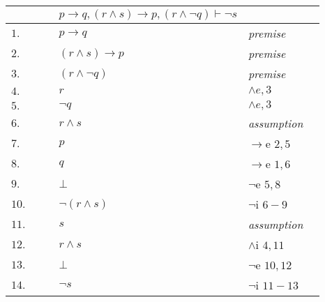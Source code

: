 \documentclass[12pt]{article}
\begin{document}
\begin{table}[H]
	\centering

	\begin{tabular}{*6{l}}
        $ $ & & & $ p \rightarrow q,(r \wedge s) \rightarrow p,(r \wedge \neg q) \vdash \neg s  $ & &\\
        \hline
        \hline

		$1.$ & & & $ p \rightarrow q $ & \textit{premise} & \\

		$2.$ & & & $(r \wedge s) \rightarrow p $ &\textit{premise} &\\

		$3.$ & & & $(r \wedge \neg q) $ &\textit{premise} &\\

		$4.$ & & & $ r $ &\textit{$\wedge e,3$} &\\

		$5.$ & & & $ \neg q $ &\textit{$\wedge e,3$} &\\ \cline{2-6}

		$6.$ &\multicolumn{1}{|c}{}& & $r \wedge s$ & {\textit{assumption}} & \multicolumn{1}{c|}{}\\

		$7.$ &\multicolumn{1}{|c}{} & & $p $ & $\rightarrow$e $2,5$ & \multicolumn{1}{c|}{}\\

		$8.$ &\multicolumn{1}{|c}{} & & $q $ & $\rightarrow$e $1,6$ & \multicolumn{1}{c|}{}\\

		$9.$ &\multicolumn{1}{|c}{}& & $ \bot$ & {$\neg$e $5,8$}&\multicolumn{1}{c|}{}\\\cline{2-6}

		$10.$ & & & $\neg(r\wedge s)$ & {$\neg$i $6-9$}& \\ \cline{2-6}

		$11.$ &\multicolumn{1}{|c}{}& &$s$ & {\textit{assumption}} &\multicolumn{1}{c|}{}\\

		$12.$ &\multicolumn{1}{|c}{}& & $r\wedge s$ & $\wedge$i $4,11$ & \multicolumn{1}{c|}{}\\

		$13.$ &\multicolumn{1}{|c}{} & & $\bot$ & {$\neg$e $10,12$} & \multicolumn{1}{c|}{}\\ \cline{2-6}

		$14.$ & & & $\neg s$ & {$\neg$i $11-13$} & \\

	\end{tabular}
\end{table}
\end{document}
